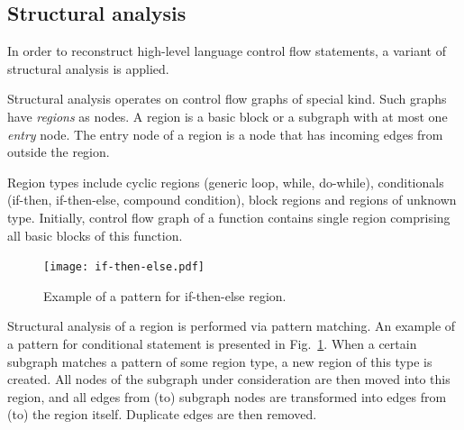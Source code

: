 \documentclass[10pt, conference, compsocconf]{IEEEtran}
\newcommand{\compact}{}
\newcommand{\skipspace}{}
\newcommand{\skipsectionspace}{}
\begin{document}


\subsection{Structural analysis}\skipsectionspace

In order to reconstruct high-level language control flow statements,
a variant \cite{PI3_09} of structural analysis \cite{muchnick97} is applied.

Structural analysis operates on control flow graphs of special kind.
Such graphs have \emph{regions} as nodes.
A region is a basic block or a subgraph with at most one \emph{entry} node.
The entry node of a region is a node that has incoming edges from outside
the region.

Region types include cyclic regions (generic loop, while, do-while),
conditionals (if-then, if-then-else, compound condition), block
regions and regions of unknown type. Initially, control flow graph
of a function contains single region comprising all basic blocks
of this function.
\begin{figure}[bt!]
\centering
  \texttt{[image: if-then-else.pdf]}
\caption{Example of a pattern for if-then-else region.}
\label{fig:if-then-else}
\end{figure}

Structural analysis of a region is performed via pattern matching.
An example of a pattern for conditional statement is presented in Fig.~\ref{fig:if-then-else}. 
When a certain subgraph matches a pattern of
some region type, a new region of this type is created. 
All nodes of the subgraph under consideration are then moved into this region,
and all edges from (to) subgraph nodes are transformed into edges from (to) the region itself. 
Duplicate edges are then removed.
\end{document}
